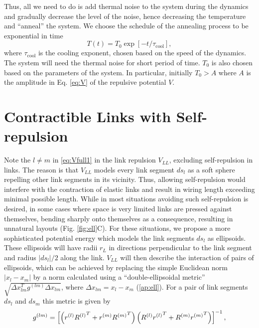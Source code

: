 \documentclass[endfloats,nofootinbib,preprint,floatfix,titlepage,superscriptaddress,linenumbers]{revtex4-1} %
\begin{document}
Thus, all we need to do is add thermal noise to the system during the dynamics and gradually decrease the level of the noise, hence decreasing the temperature and ``anneal'' the system. We choose the schedule of the annealing process to be exponential in time
\begin{equation}
T(t) = T_0 \exp[-t/\tau_{\mathrm{cool}}], \label{eq:coolexp}
\end{equation}
where $\tau_{\mathrm{cool}}$ is the cooling exponent, chosen based on the speed of the dynamics. The system will need the thermal noise for short period of time. $T_0$ is also chosen based on the parameters of the system. In particular, initially $T_0 > A$ where $A$ is the amplitude in Eq. \eqref{eq:V} of the repulsive potential $V$.   



\section{Contractible Links with Self-repulsion\label{ap:ell}}
Note the $l\ne m $ in \eqref{eq:Vfull1} in the link repulsion $V_{LL}$, excluding self-repulsion in links. 
The reason is that $V_{LL}$ models every link segment $ds_l$ as a soft sphere repelling other link segments in its vicinity.
Thus, allowing self-repulsion would interfere with the contraction of elastic links and result in wiring length exceeding minimal possible length. 
While in most situations avoiding such self-repulsion is desired, in some cases where space is very limited links are pressed against themselves, bending sharply onto themselves as a consequence, resulting in unnatural layouts (Fig. \ref{fig:ell}C).  
For these situations, we propose a more sophisticated potential energy which models the link segments $ds_l$ as ellipsoids. 
These ellipsoids will have radii $r_L$ in directions perpendicular to the link segment and radius $|ds_l|/2$ along the link. 
$V_{LL}$ will then describe the interaction of pairs of ellipsoids, which can be achieved by replacing the simple Euclidean norm $|x_l-x_m|%
$ by a norm calculated using a ``double-ellipsoidal metric'' $\sqrt{\Delta x_{lm}^Tg^{(lm)}\Delta x_{lm}}$, where $\Delta x_{lm} = x_l-x_m$ (\ref{ap:ell}). 
For a pair of link segments $ds_l$ and $ds_m$ this metric is given by 
\begin{align}
    g^{(lm)} = \left[\left(r^{(l)}{R^{(l)}}^T+ r^{(m)}{R^{(m)}}^T\right) \left(R^{(l)}{r^{(l)}}^T+ R^{(m)}{r^{(m)}}^T\right) \right]^{-1},
    \label{eq:g-ell}
\end{align}
\end{document}
